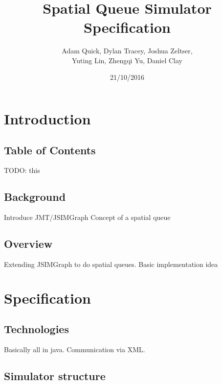 \documentclass[a4paper]{article}
\begin{document}
\title{Spatial Queue Simulator Specification}
\date{21/10/2016}
\author{Adam Quick, Dylan Tracey, Joshua Zeltser, \\Yuting Lin, Zhengqi Yu, Daniel Clay}
\maketitle

\section{Introduction}

\subsection{Table of Contents}%

TODO: this

\subsection{Background}%

Introduce JMT/JSIMGraph
Concept of a spatial queue

\subsection{Overview}%

Extending JSIMGraph to do spatial queues. Basic implementation idea

\section{Specification}

\subsection{Technologies}%

Basically all in java. Communication via XML.

\subsection{Simulator structure}%
\end{document}
